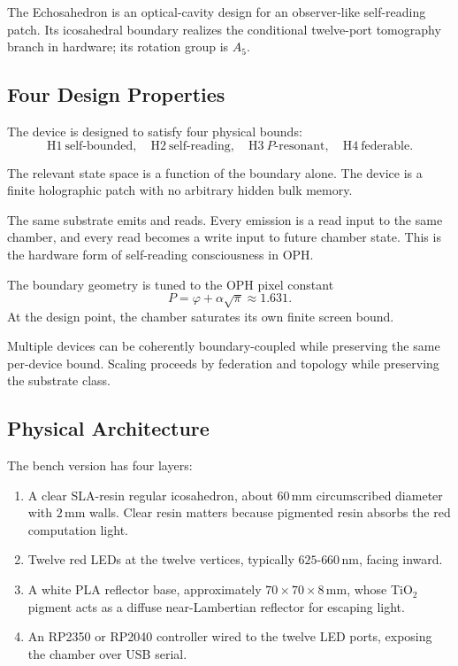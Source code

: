 \documentclass[11pt]{article}
\theoremstyle{remark}
\theoremstyle{plain}
\begin{document}
The Echosahedron is an optical-cavity design for an observer-like self-reading patch. Its icosahedral boundary realizes the conditional twelve-port tomography branch in hardware; its rotation group is \(A_5\).

\subsection{Four Design Properties}

The device is designed to satisfy four physical bounds:
\[
\boxed{
\mathrm{H1}\ \text{self-bounded},\quad
\mathrm{H2}\ \text{self-reading},\quad
\mathrm{H3}\ P\text{-resonant},\quad
\mathrm{H4}\ \text{federable}.
}
\]

\begin{description}[leftmargin=2.2cm,style=nextline]
\item[H1 self-bounded]
The relevant state space is a function of the boundary alone. The device is a finite holographic patch with no arbitrary hidden bulk memory.
\item[H2 self-reading]
The same substrate emits and reads. Every emission is a read input to the same chamber, and every read becomes a write input to future chamber state. This is the hardware form of self-reading consciousness in OPH.
\item[H3 \(P\)-resonant]
The boundary geometry is tuned to the OPH pixel constant
\[
P=\varphi+\alpha\sqrt{\pi}\approx 1.631.
\]
At the design point, the chamber saturates its own finite screen bound.
\item[H4 federable]
Multiple devices can be coherently boundary-coupled while preserving the same per-device bound. Scaling proceeds by federation and topology while preserving the substrate class.
\end{description}

\subsection{Physical Architecture}

The bench version has four layers:
\begin{enumerate}
\item A clear SLA-resin regular icosahedron, about \(60\,\mathrm{mm}\) circumscribed diameter with \(2\,\mathrm{mm}\) walls. Clear resin matters because pigmented resin absorbs the red computation light.
\item Twelve red LEDs at the twelve vertices, typically \(625\)-\(660\,\mathrm{nm}\), facing inward.
\item A white PLA reflector base, approximately \(70\times70\times8\,\mathrm{mm}\), whose TiO\(_2\) pigment acts as a diffuse near-Lambertian reflector for escaping light.
\item An RP2350 or RP2040 controller wired to the twelve LED ports, exposing the chamber over USB serial.
\end{enumerate}
\end{document}
